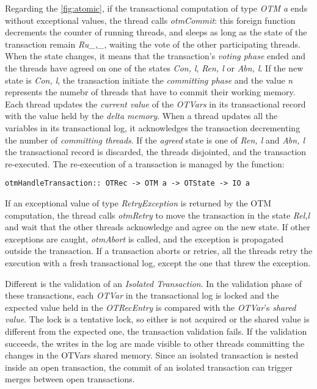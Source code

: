 Regarding the \cref{fig:atomic}, if the transactional computation of type \emph{OTM a} ends without exceptional values, the thread calls \emph{otmCommit}: this foreign function decrements the counter of running threads, and sleeps as long as the state of the transaction remain \emph{Ru\textlangle \_,\_\textrangle}, waiting the vote of the other participating threads.
When the state changes, it means that the transaction's \emph{voting phase} ended and the threads have agreed on one of the states \emph{Co\textlangle n, l\textrangle}, \emph{Re\textlangle n, l\textrangle} or \emph{Ab\textlangle n, l\textrangle}.
If the new state is \emph{Co\textlangle n, l\textrangle}, the transaction initiate the \emph{committing phase} and the value \emph{n} represents the numebr of threads that have to commit their working memory.
Each thread updates the \emph{current value} of the \emph{OTVars} in its transactional record with the value held by the \emph{delta memory}. When a thread updates all the variables in its transactional log, it acknowledges the transaction decrementing the number of \emph{committing threads}.
If the \emph{agreed} state is one of \emph{Re\textlangle n, l\textrangle} and \emph{Ab\textlangle n, l\textrangle} the transactional record is discarded, the threads disjointed, and the transaction re-executed. The re-execution of a transaction is managed by the function:
\begin{Verbatim}
otmHandleTransaction:: OTRec -> OTM a -> OTState -> IO a
\end{Verbatim}

If an exceptional value of type \emph{RetryException} is returned by the OTM computation, the thread calls \emph{otmRetry} to move the transaction in the state \emph{Re\textlangle l,l\textrangle} and wait that the other threads acknowledge and agree on the new state. If other exceptions are caught, \emph{otmAbort} is called, and the exception is propagated outside the transaction. If a transaction aborts or retries, all the threads retry the execution with a fresh transactional log, except the one that threw the exception.


Different is the validation of an \emph{Isolated Transaction}.
In the validation phase of these transactions, each \emph{OTVar} in the transactional log is locked and the expected value held in the \emph{OTRecEntry} is compared with the \emph{OTVar}'s \emph{shared value}.
The lock is a tentative lock, so either is not acquired or the shared value is different from the expected one, the transaction validation fails.
If the validation succeeds, the writes in the log are made visible to other threads committing the changes in the OTVars shared memory. Since an isolated transaction is nested inside an open transaction, the commit of an isolated transaction can trigger merges between open transactions.

